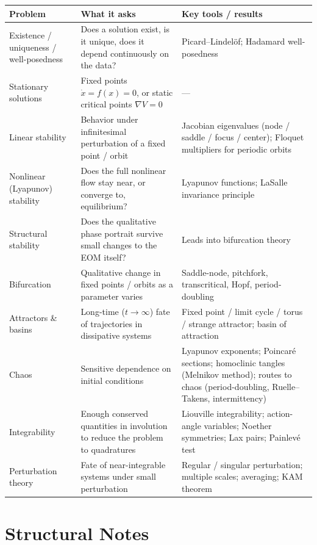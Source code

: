 \documentclass[11pt]{article}
\begin{document}
\begin{center}
\begin{tabular}{@{}p{4cm}p{5cm}p{6cm}@{}}
\toprule
\textbf{Problem} & \textbf{What it asks} & \textbf{Key tools / results} \\
\midrule
Existence / uniqueness / well-posedness &
Does a solution exist, is it unique, does it depend continuously on the data? &
Picard--Lindel\"of; Hadamard well-posedness \\
\addlinespace
Stationary solutions &
Fixed points $\dot{x} = f(x) = 0$, or static critical points $\nabla V = 0$ &
--- \\
\addlinespace
Linear stability &
Behavior under infinitesimal perturbation of a fixed point / orbit &
Jacobian eigenvalues (node / saddle / focus / center); Floquet multipliers for periodic orbits \\
\addlinespace
Nonlinear (Lyapunov) stability &
Does the full nonlinear flow stay near, or converge to, equilibrium? &
Lyapunov functions; LaSalle invariance principle \\
\addlinespace
Structural stability &
Does the qualitative phase portrait survive small changes to the EOM itself? &
Leads into bifurcation theory \\
\addlinespace
Bifurcation &
Qualitative change in fixed points / orbits as a parameter varies &
Saddle-node, pitchfork, transcritical, Hopf, period-doubling \\
\addlinespace
Attractors \& basins &
Long-time ($t \to \infty$) fate of trajectories in dissipative systems &
Fixed point / limit cycle / torus / strange attractor; basin of attraction \\
\addlinespace
Chaos &
Sensitive dependence on initial conditions &
Lyapunov exponents; Poincar\'e sections; homoclinic tangles (Melnikov method); routes to chaos (period-doubling, Ruelle--Takens, intermittency) \\
\addlinespace
Integrability &
Enough conserved quantities in involution to reduce the problem to quadratures &
Liouville integrability; action-angle variables; Noether symmetries; Lax pairs; Painlev\'e test \\
\addlinespace
Perturbation theory &
Fate of near-integrable systems under small perturbation &
Regular / singular perturbation; multiple scales; averaging; KAM theorem \\
\bottomrule
\end{tabular}
\end{center}

\section*{Structural Notes}
\end{document}

